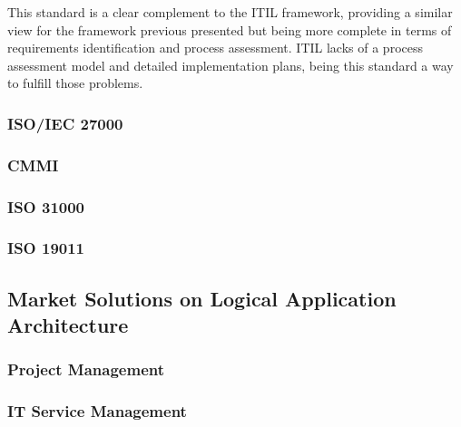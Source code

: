 \begin{itemize}
  This standard is a clear complement to the ITIL framework, providing a similar view for the framework previous presented but being more complete in terms of requirements identification and process assessment. ITIL lacks of a process assessment model and detailed implementation plans, being this standard a way to fulfill those problems.\par
  
\end{itemize}

\subsubsection{ISO/IEC 27000}

\subsubsection{CMMI}

\subsubsection{ISO 31000}

\subsubsection{ISO 19011}



\subsection{Market Solutions on Logical Application Architecture}

\subsubsection{Project Management}

\subsubsection{IT Service Management}




